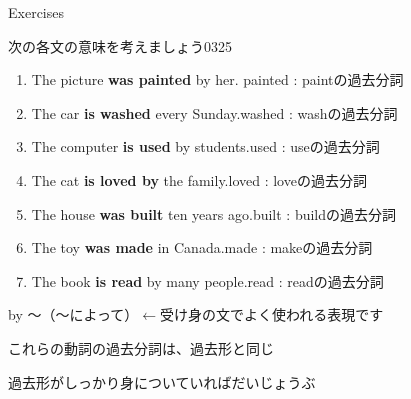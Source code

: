 \documentclass[aspectratio=169,xcolor={dvipsnames,table}]{beamer}
\newcommand{\myaudio}[1]{\href{#1}{\faVolumeUp}}
\begin{document}
\begin{frame}[plain]{Exercises}
 
{\small 次の各文の意味を考えましょう}\hfill{\tiny 0325}\,{\scriptsize \myaudio{./audio/051_passive_02.mp3}}

\begin{enumerate}
 \item The picture \textbf{was painted} by her.\hfill{}{ \scriptsize painted : paintの過去分詞}
 \item The car \textbf{is washed} every Sunday.\hfill{}{\scriptsize washed : washの過去分詞}
 \item The computer \textbf{is used} by students.\hfill{}{\scriptsize used  : useの過去分詞}
 \item The cat \textbf{is loved by} the family.\hfill{}{\scriptsize loved  : loveの過去分詞}
 \item The house \textbf{was built} ten years ago.\hfill{}{\scriptsize built  : buildの過去分詞}
 \item The toy \textbf{was made} in Canada.\hfill{}{\scriptsize made  : makeの過去分詞}
 \item The book \textbf{is read} by many people.\hfill{}{\scriptsize read  : readの過去分詞}
\end{enumerate}

\hfill{\scriptsize by ～（～によって）$\longleftarrow$受け身の文でよく使われる表現です}

\pause

{\small これらの動詞の過去分詞は、過去形と同じ}

\vspace{-5pt}

{\small 過去形がしっかり身についていればだいじょうぶ}
\end{frame}
\end{document}
